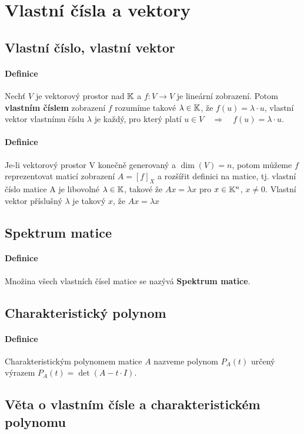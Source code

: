 \documentclass[a4paper,10pt]{article}
\begin{document}
\section{Vlastní čísla a vektory}
\setcounter{equation}{0}
\subsection{Vlastní číslo, vlastní vektor}
\setcounter{equation}{0}
\paragraph{Definice}
Nechť $V$ je vektorový prostor nad $\mathbb{K}$ a $f: V \to V$ je lineární zobrazení.
Potom \textbf{vlastním číslem} zobrazení $f$ rozumíme takové $\lambda \in \mathbb{K}$,
že $f(u) = \lambda \cdot u$, vlastní vektor vlastnímu číslu $\lambda$ je každý,
pro který platí $u \in V \quad \Rightarrow \quad  f(u) = \lambda \cdot u$.
\paragraph{Definice}
Je-li vektorový prostor V konečně generovaný a $\dim(V) = n$, potom můžeme $f$
reprezentovat maticí zobrazení $A=[f]_X$ a rozšířit definici na matice, tj.
vlastní číslo matice A je libovolné $\lambda \in \mathbb{K}$, takové že $Ax = \lambda x$
pro $x \in \mathbb{K}^n$, $x \neq 0$. Vlastní vektor příslušný $\lambda$ je takový $x$, že
$Ax = \lambda x$

\subsection{Spektrum matice}
\setcounter{equation}{0}
\paragraph{Definice}
Množina všech vlastních čísel matice se nazývá \textbf{Spektrum matice}.


\subsection{Charakteristický polynom}
\setcounter{equation}{0}
\paragraph{Definice}
Charakteristickým polynomem matice $A$ nazveme polynom $P_A(t)$ určený výrazem
$P_A(t) = \det(A - t \cdot I)$.

\subsection{Věta o vlastním čísle a charakteristickém polynomu}
\setcounter{equation}{0}
\end{document}
